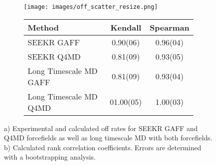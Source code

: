 \begin{figure}
	\begin{subfigure}{\linewidth}
	\texttt{[image: images/off\_scatter\_resize.png]}
	\caption{}
	\end{subfigure}

	\bigskip
	

	\begin{subfigure}{\linewidth}%
    \begin{tabular}{
l  S[table-format = 2.3(3), separate-uncertainty] 
  S[table-format = 2.3(3), separate-uncertainty] 
 }%

\textbf{Method} & \textbf{Kendall} & \textbf{Spearman}  \\
\hline
      SEEKR GAFF      &    0.90(06)           &    0.96(04)            \\ 
      SEEKR Q4MD      &    0.81(09)           &    0.93(05)             \\ 
      Long Timescale MD GAFF      &    0.81(09)           &    0.93(04)                     \\ 
      Long Timescale MD Q4MD      &    01.00(05)           &    1.00(03)                     \\ 
     

    \end{tabular}
        \caption{}
	\end{subfigure}
	\caption{a) Experimental and calculated off rates for SEEKR GAFF and Q4MD forcefields as well as long timescale MD with both forcefields. b) Calculated rank correlation coefficients. Errors are determined with a bootstrapping analysis. }
	\label{fig: off_scatter}
\end{figure}